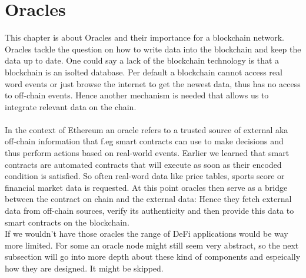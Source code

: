 \documentclass{article}
\begin{document}
\section{Oracles}
This chapter is about Oracles and their importance for a blockchain network. Oracles tackle the question on how to write data into the blockchain and keep the data up to date. One could say a lack of the blockchain technology is that a blockchain is an isolted database. Per default a blockchain cannot access real word events or just browse the internet to get the newest data, thus has no access to off-chain events. Hence another mechanism is needed that allows us to integrate relevant data on the chain.\\
\\
In the context of Ethereum an oracle refers to a trusted source of external aka off-chain information that f.eg smart contracts can use to make decisions and thus perform actions based on real-world events. Earlier we learned that smart contracts are automated contracts that will execute as soon as their encoded condition is satisfied. So often real-word data like price tables, sports score or financial market data is requested. At this point oracles then serve as a bridge between the contract on chain and the external data: Hence they fetch external data from off-chain sources, verify its authenticity and then provide this data to smart contracts on the blockchain.\\
If we wouldn't have those oracles the range of DeFi applications would be way more limited. 
For some an oracle node might still seem very abstract, so the next subsection will go into more depth about these kind of components and espeically how they are designed. It might be skipped.
\end{document}
